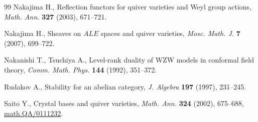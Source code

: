\begin{thebibliography}{99}
Nakajima H.,  Ref\/lection functors for quiver varieties and {W}eyl group
  actions, {\it Math. Ann.} \textbf{327} (2003), 671--721.

Nakajima H.,  Sheaves on $ALE$ spaces and quiver varieties, {\it Mosc. Math. J.}
  \textbf{7} (2007),  699--722.

Nakanishi T., Tsuchiya A.,  Level-rank duality of {WZW} models in
  conformal f\/ield theory, {\it Comm. Math. Phys.} \textbf{144} (1992),
  351--372. %

Rudakov A.,  Stability for an abelian category, {\it J. Algebra} \textbf{197}
  (1997),   231--245. %

Saito Y., Crystal bases and quiver varieties, {\it Math. Ann.} \textbf{324}
  (2002),  675--688, \href{http://arxiv.org/abs/math.QA/0111232}{math.QA/0111232}. %


\end{thebibliography}
